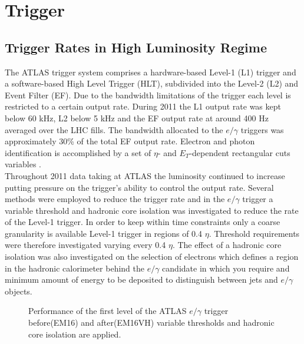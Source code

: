 \chapter{Trigger}



\section{Trigger Rates in High Luminosity Regime}
The ATLAS trigger system comprises a
hardware-based Level-1 (L1) trigger and a software-based
High Level Trigger (HLT), subdivided into the Level-2
(L2) and Event Filter (EF). Due to the bandwidth
limitations of the trigger each level is restricted to a
certain output rate. During 2011 the L1 output rate was
kept below 60 kHz, L2 below 5 kHz and the EF output
rate at around 400 Hz averaged over the LHC fills. The
bandwidth allocated to the $e/\gamma$ triggers was
approximately 30\% of the total EF output rate.
Electron and photon identification is accomplished by a
set of $\eta$- and $E_{T}$-dependent rectangular cuts variables
\cite{trig1, trig2}.\\
Throughout 2011 data taking at ATLAS the luminosity continued to increase putting pressure on the trigger's ability to control the output rate. Several methods were employed to reduce the trigger rate and in the $e/\gamma$ trigger a variable threshold and hadronic core isolation was investigated to reduce the rate of the Level-1 trigger. In order to keep within time constraints only a coarse granularity is available Level-1 trigger in regions of 0.4 $\eta$. Threshold requirements were therefore investigated varying every 0.4 $\eta$. The effect of a hadronic core isolation was also investigated on the selection of electrons which defines a region in the hadronic calorimeter behind the $e/\gamma$ candidate in which you require and minimum amount of energy to be deposited to distinguish between jets and $e/\gamma$ objects. 


\begin{figure}[h!]
\centering

\caption{Performance of the first level of the ATLAS $e/\gamma$ trigger before(EM16) and after(EM16VH) variable thresholds and hadronic core isolation are applied.}
\label{fig:L1}
\end{figure}

